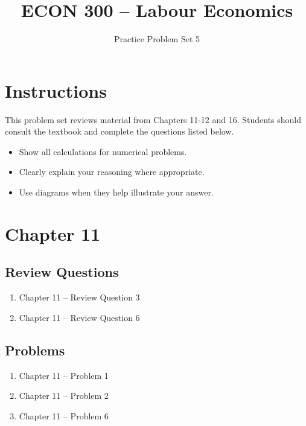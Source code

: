 \documentclass[12pt]{article}
\title{\textbf{ECON 300 -- Labour Economics}}
\author{Practice Problem Set 5}
\date{}
\begin{document}
\maketitle

\section*{Instructions}

This problem set reviews material from Chapters 11-12 and 16.  
Students should consult the textbook and complete the questions listed below.

\begin{itemize}
\item Show all calculations for numerical problems.
\item Clearly explain your reasoning where appropriate.
\item Use diagrams when they help illustrate your answer.
\end{itemize}

\vspace{0.5cm}

\section*{Chapter 11}

\subsection*{Review Questions}

\begin{enumerate}
\item Chapter 11 -- Review Question 3
\item Chapter 11 -- Review Question 6
\end{enumerate}

\subsection*{Problems}

\begin{enumerate}
\item Chapter 11 -- Problem 1
\item Chapter 11 -- Problem 2
\item Chapter 11 -- Problem 6
\end{enumerate}

\vspace{0.5cm}
\end{document}
